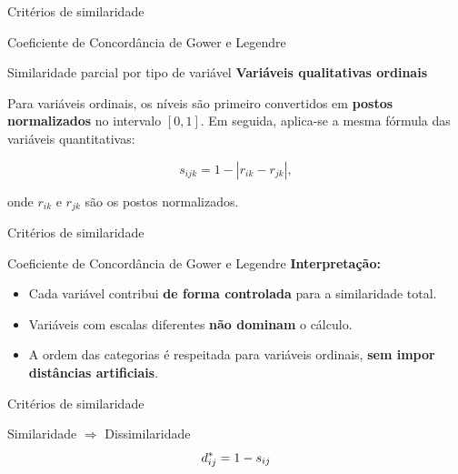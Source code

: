 \documentclass[
  ignorenonframetext,
  aspectratio=169,
]{beamer}
\providecommand{\tightlist}{%
  \setlength{\itemsep}{0pt}\setlength{\parskip}{0pt}}
\begin{document}
\begin{frame}{Critérios de similaridade}
\protect{}\label{crituxe9rios-de-similaridade-11}
\begin{block}{Coeficiente de Concordância de Gower e Legendre}
\protect{}\label{coeficiente-de-concorduxe2ncia-de-gower-e-legendre-5}
\begin{block}{Similaridade parcial por tipo de variável}
\protect{}\label{similaridade-parcial-por-tipo-de-variuxe1vel-2}
\textbf{Variáveis qualitativas ordinais}

Para variáveis ordinais, os níveis são primeiro convertidos em
\textbf{postos normalizados} no intervalo \([0,1]\). Em seguida,
aplica-se a mesma fórmula das variáveis quantitativas:

\[
s_{ijk}
=
1 - |r_{ik} - r_{jk}|,
\]

onde \(r_{ik}\) e \(r_{jk}\) são os postos normalizados.
\end{block}
\end{block}
\end{frame}

\begin{frame}{Critérios de similaridade}
\protect{}\label{crituxe9rios-de-similaridade-12}
\begin{block}{Coeficiente de Concordância de Gower e Legendre}
\protect{}\label{coeficiente-de-concorduxe2ncia-de-gower-e-legendre-6}
\textbf{Interpretação:}

\begin{itemize}
\tightlist
\item
  Cada variável contribui \textbf{de forma controlada} para a
  similaridade total.
\item
  Variáveis com escalas diferentes \textbf{não dominam} o cálculo.
\item
  A ordem das categorias é respeitada para variáveis ordinais,
  \textbf{sem impor distâncias artificiais}.
\end{itemize}
\end{block}
\end{frame}

\begin{frame}{Critérios de similaridade}
\protect{}\label{crituxe9rios-de-similaridade-13}
\begin{block}{Similaridade \(\Longrightarrow\) Dissimilaridade}
\protect{}\label{similaridade-longrightarrow-dissimilaridade}
\[\Large d_{ij}^* = 1 - s_{ij}\]
\end{block}
\end{frame}
\end{document}

